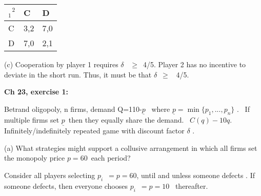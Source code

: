 \documentclass[handout]{beamer}
\begin{document}
\begin{frame}%

\begin{tabular}{|l|l|l|}
\hline
$_{1}^{\text{ \ \ \ \ \ \ }2}$ & {\footnotesize C} & {\footnotesize D} \\ 
\hline
{\footnotesize C} & {\footnotesize 3,2} & {\footnotesize 7,0} \\ \hline
{\footnotesize D} & {\footnotesize 7,0} & {\footnotesize 2,1} \\ \hline
\end{tabular}

{\footnotesize (c) Cooperation by player 1 requires }$\delta ${\footnotesize %
\ }$\geq ${\footnotesize \ 4/5. Player 2 has no incentive to deviate in the
short run. Thus, it must be that }$\delta ${\footnotesize \ }$\geq $%
{\footnotesize \ 4/5.}

\end{frame}%

\begin{frame}%

\textbf{Ch 23, exercise 1:}

{\footnotesize Betrand oligopoly, n firms, demand Q=110-}$\underline{p}$%
{\footnotesize \ where }$\underline{p}=\min \{p_{1},...,p_{n}\}$%
{\footnotesize . \ If multiple firms set }$\underline{p}${\footnotesize \
then they equally share the demand. \ }$C(q)-10q${\footnotesize .
Infinitely/indefinitely repeated game with discount factor }$\delta $%
{\footnotesize .}

{\footnotesize \bigskip }

\pause%
{\footnotesize (a) What strategies might support a collusive arrangement in
which all firms set the monopoly price }$p=60${\footnotesize \ each period?}

{\footnotesize Consider all players selecting }$p_{i}${\footnotesize \ }$%
=p=60${\footnotesize , until and unless someone defects . If someone
defects, then everyone chooses }$p_{i}${\footnotesize \ }$=p=10$%
{\footnotesize \ thereafter.\bigskip }

\end{frame}%
\end{document}
